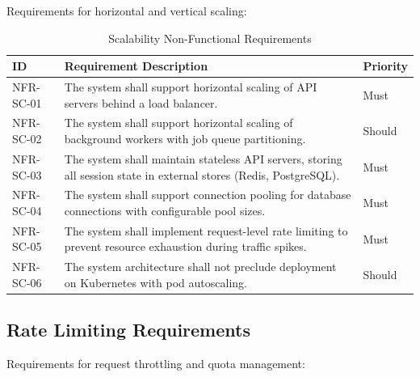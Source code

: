 Requirements for horizontal and vertical scaling:

\begin{table}[htbp]
\centering
\caption{Scalability Non-Functional Requirements}
\label{tab:nfr-scalability}
\small
\begin{tabularx}{\textwidth}{|l|X|l|}
\hline
\textbf{ID} & \textbf{Requirement Description} & \textbf{Priority} \\
\hline
NFR-SC-01 & The system shall support horizontal scaling of API servers behind a load balancer. & Must \\
\hline
NFR-SC-02 & The system shall support horizontal scaling of background workers with job queue partitioning. & Should \\
\hline
NFR-SC-03 & The system shall maintain stateless API servers, storing all session state in external stores (Redis, PostgreSQL). & Must \\
\hline
NFR-SC-04 & The system shall support connection pooling for database connections with configurable pool sizes. & Must \\
\hline
NFR-SC-05 & The system shall implement request-level rate limiting to prevent resource exhaustion during traffic spikes. & Must \\
\hline
NFR-SC-06 & The system architecture shall not preclude deployment on Kubernetes with pod autoscaling. & Should \\
\hline
\end{tabularx}
\end{table}

\subsection{Rate Limiting Requirements}
\label{subsec:nfr-ratelimit}

Requirements for request throttling and quota management:

